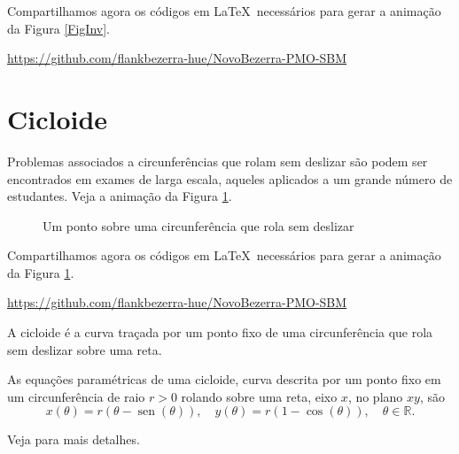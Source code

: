 \documentclass[10pt]{article}
\DeclareMathOperator{\sen}{sen} %
\theoremstyle{plain} %
\theoremstyle{definition} %
\theoremstyle{remark} %
\begin{document}
Compartilhamos agora os códigos em  \LaTeX\ necessários para gerar a animação da Figura \ref{FigInv}.



\href{https://github.com/flankbezerra-hue/NovoBezerra-PMO-SBM}{https://github.com/flankbezerra-hue/NovoBezerra-PMO-SBM}



\section{Cicloide}\label{SecCicloide}

Problemas associados a circunferências que rolam sem deslizar são podem ser encontrados em exames de larga escala, aqueles aplicados a um grande número de estudantes. Veja a animação da Figura \ref{Animacao1}.

\begin{figure}[!htp]
\centering
\begin{animateinline}[poster = last, controls]{25}
{
}
\end{animateinline}
\caption{Um ponto sobre uma circunferência que rola sem deslizar}
\label{Animacao1}
\end{figure}

Compartilhamos agora os códigos em  \LaTeX\ necessários para gerar a animação da Figura  \ref{Animacao1}.


\href{https://github.com/flankbezerra-hue/NovoBezerra-PMO-SBM}{https://github.com/flankbezerra-hue/NovoBezerra-PMO-SBM}


\begin{definition}
A cicloide é a curva traçada por um ponto fixo de uma circunferência que rola sem deslizar sobre uma reta. 
\end{definition}

\begin{theorem}
As equações paramétricas de uma cicloide, curva descrita por um ponto fixo em um circunferência de raio $r>0$ rolando sobre uma reta, eixo $x$, no plano $xy$, são
\[
x(\theta)=r(\theta-\sen(\theta)),\quad y(\theta)=r(1-\cos(\theta)),\quad \theta\in\mathbb{R}.
\]
\end{theorem}
Veja \cite{ASN} para mais detalhes.
\end{document}

